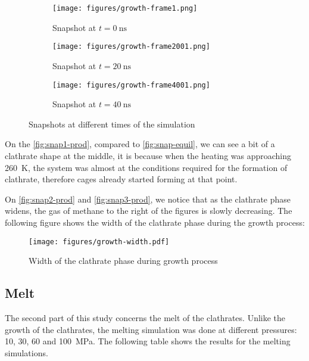 \begin{figure}[htbp]
    \centering
    \begin{subfigure}[b]{1.\linewidth}
        \centering
        \texttt{[image: figures/growth-frame1.png]}
        \caption{Snapshot at $t = \SI{0}{\nano\second}$}
        \label{fig:snap1-prod}
    \end{subfigure}
    \begin{subfigure}[b]{1.\linewidth}
        \centering
        \texttt{[image: figures/growth-frame2001.png]}
        \caption{Snapshot at $t = \SI{20}{\nano\second}$}
        \label{fig:snap2-prod}
    \end{subfigure}
    \begin{subfigure}[b]{1.\linewidth}
        \centering
        \texttt{[image: figures/growth-frame4001.png]}
        \caption{Snapshot at $t = \SI{40}{\nano\second}$}
        \label{fig:snap3-prod}
    \end{subfigure}
    \caption{Snapshots at different times of the simulation}
    \label{fig:snaps-prod}
\end{figure}

On the \autoref{fig:snap1-prod}, compared to \autoref{fig:snap-equil}, we can see a bit of a clathrate shape at the middle, it is because when the heating was approaching \SI{260}{\kelvin}, the system was almost at the conditions required for the formation of clathrate, therefore cages already started forming at that point.

On \autoref{fig:snap2-prod} and \autoref{fig:snap3-prod}, we notice that as the clathrate phase widens, the gas of methane to the right of the figures is slowly decreasing. 
The following figure shows the width of the clathrate phase during the growth process:
\begin{figure}[htbp]
    \centering
    \texttt{[image: figures/growth-width.pdf]}
    \caption{Width of the clathrate phase during growth process}
    \label{fig:width-grows}
\end{figure}

\subsection{Melt}
The second part of this study concerns the melt of the clathrates. Unlike the growth of the clathrates, the melting simulation was done at different pressures: 10, 30, 60 and \SI{100}{\mega\pascal}. The following table shows the results for the melting simulations.

